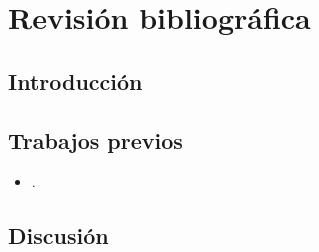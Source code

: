  
\chapter{Revisión bibliográfica}
\section{Introducción}

\section{Trabajos previos}

\begin{itemize}
\item {}.
\end{itemize}

\section{Discusión}

